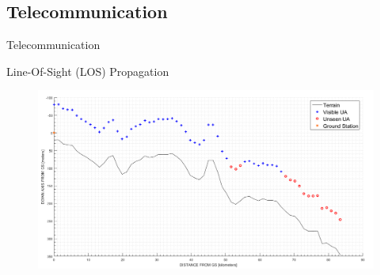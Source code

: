 \subsection{Telecommunication}

\begin{frame}{Telecommunication}{}

  \begin{block}{Line-Of-Sight (LOS) Propagation}
	\begin{figure}
        \includegraphics[scale=0.25]{../report/figures/los_2points.png}
    \end{figure}
  \end{block}
  






\end{frame}
